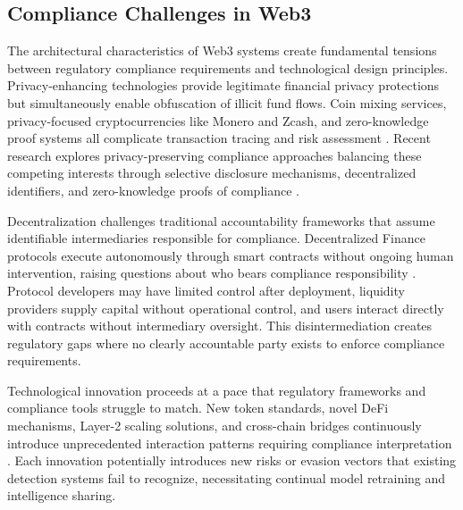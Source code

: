 \documentclass[conference,compsoc]{IEEEtran}
\begin{document}
\subsection{Compliance Challenges in Web3}

The architectural characteristics of Web3 systems create fundamental tensions between regulatory compliance requirements and technological design principles. Privacy-enhancing technologies provide legitimate financial privacy protections but simultaneously enable obfuscation of illicit fund flows. Coin mixing services, privacy-focused cryptocurrencies like Monero and Zcash, and zero-knowledge proof systems all complicate transaction tracing and risk assessment \cite{moser2018empiricalanalysistraceability,kappos2018empiricalanalysisanonymity}. Recent research explores privacy-preserving compliance approaches balancing these competing interests through selective disclosure mechanisms, decentralized identifiers, and zero-knowledge proofs of compliance \cite{yang2024researchidentitydata,ben-sasson2017scalablezeroknowledge,zhang2024blockchainzeroknowledge}.

Decentralization challenges traditional accountability frameworks that assume identifiable intermediaries responsible for compliance. Decentralized Finance protocols execute autonomously through smart contracts without ongoing human intervention, raising questions about who bears compliance responsibility \cite{harvey2021defifuturefinance,werbach2018trustverifywhy}. Protocol developers may have limited control after deployment, liquidity providers supply capital without operational control, and users interact directly with contracts without intermediary oversight. This disintermediation creates regulatory gaps where no clearly accountable party exists to enforce compliance requirements.

Technological innovation proceeds at a pace that regulatory frameworks and compliance tools struggle to match. New token standards, novel DeFi mechanisms, Layer-2 scaling solutions, and cross-chain bridges continuously introduce unprecedented interaction patterns requiring compliance interpretation \cite{mohammedabdul2024navigatingblockchainstwin,xu2024exploringblockchaintechnology}. Each innovation potentially introduces new risks or evasion vectors that existing detection systems fail to recognize, necessitating continual model retraining and intelligence sharing.



\end{document}
